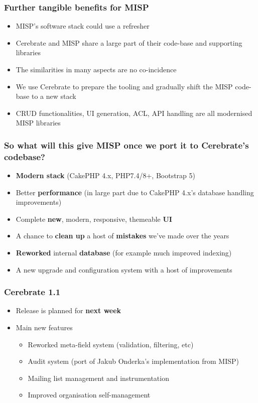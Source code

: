\begin{frame}
	\frametitle{Further tangible benefits for MISP}
	\begin{itemize}
            \item MISP's software stack could use a refresher
            \item Cerebrate and MISP share a large part of their code-base and supporting libraries
            \item The similarities in many aspects are no co-incidence
            \item We use Cerebrate to prepare the tooling and gradually shift the MISP code-base to a new stack
            \item CRUD functionalities, UI generation, ACL, API handling are all modernised MISP libraries
	\end{itemize}
\end{frame}

\begin{frame}
	\frametitle{So what will this give MISP once we port it to Cerebrate's codebase?}
	\begin{itemize}
            \item {\bf Modern stack} (CakePHP 4.x, PHP7.4/8+, Bootstrap 5)
            \item Better {\bf performance} (in large part due to CakePHP 4.x's database handling improvements)
            \item Complete {\bf new}, modern, responsive, themeable {\bf UI}
            \item A chance to {\bf clean up} a host of {\bf mistakes} we've made over the years
            \item {\bf Reworked} internal {\bf database} (for example much improved indexing)
            \item A new upgrade and configuration system with a host of improvements
	\end{itemize}
\end{frame}

\begin{frame}
	\frametitle{Cerebrate 1.1}
	\begin{itemize}
            \item Release is planned for {\bf next week}
            \item Main new features
            \begin{itemize}
                \item Reworked meta-field system (validation, filtering, etc)
                \item Audit system (port of Jakub Onderka's implementation from MISP)
                \item Mailing list management and instrumentation
                \item Improved organisation self-management
            \end{itemize}
	\end{itemize}
\end{frame}

